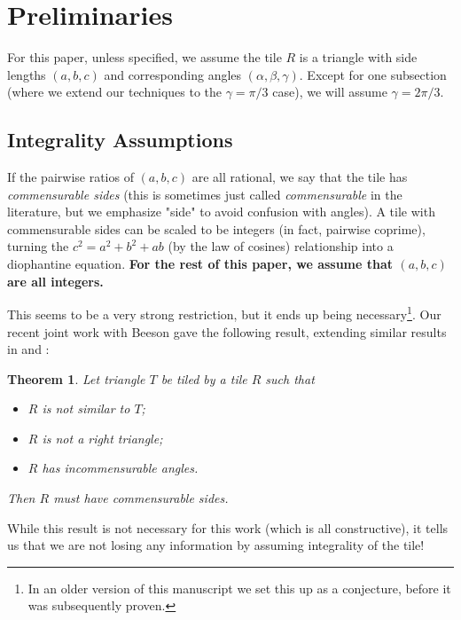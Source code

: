 \documentclass{amsart}
\theoremstyle{plain}
\newtheorem{thm}{Theorem}
\theoremstyle{definition}
\begin{document}
\section {Preliminaries}
\label{sec:prelims}

For this paper, unless specified, we assume the tile $R$ is a triangle with side lengths $(a,b,c)$ and corresponding angles $(\alpha, \beta, \gamma)$. Except for one subsection (where we extend our techniques to the $\gamma = \pi/3$ case), we will assume $\gamma=2\pi/3.$ 

\subsection{Integrality Assumptions}

If the pairwise ratios of $(a, b, c)$ are all rational, we say that the tile has \emph{commensurable sides} (this is sometimes just called \emph{commensurable} in the literature, but we emphasize "side" to avoid confusion with angles). A tile with commensurable sides can be scaled to be integers (in fact, pairwise coprime), turning the $c^2 = a^2 + b^2 + ab$ (by the law of cosines) relationship into a diophantine equation. \textbf{For the rest of this paper, we assume that $(a,b,c)$ are all integers.}

This seems to be a very strong restriction, but it ends up being necessary\footnote{In an older version of this manuscript we set this up as a conjecture, before it was subsequently proven.}. Our recent joint work with Beeson gave the following result, extending similar results in \cite{laczkovich2012tilings} and \cite{beeson-isosceles}: 

\begin{thm}\cite[Theorem 1.2]{rationality}
    \label{thm:rationality}
 Let triangle $T$ be tiled by a tile $R$ such that
    \begin{itemize}
        \item $R$ is not similar to $T$;
        \item $R$ is not a right triangle;
        \item $R$ has incommensurable angles.
    \end{itemize}
    Then $R$ must have commensurable sides.
\end{thm}

While this result is not necessary for this work (which is all constructive), it tells us that we are not losing any information by assuming integrality of the tile!
\end{document}
